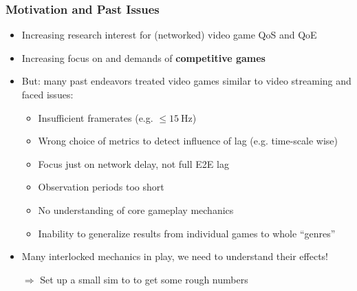 \documentclass{UDEbeamerEN}
\begin{document}
\begin{frame}
	\frametitle{Motivation and Past Issues}

	\begin{itemize}
		\item Increasing research interest for (networked) video game QoS and QoE
		\item Increasing focus on and demands of \textbf{competitive games}
		\item But: many past endeavors treated video games similar to video streaming and faced issues:
			\pause
			\begin{itemize}
				\item Insufficient framerates (e.g. $\leq \SI{15}{\hertz}$)
				\item Wrong choice of metrics to detect influence of lag (e.g. time-scale wise)
				\item Focus just on network delay, not full E2E lag
				\item Observation periods too short
				\item No understanding of core gameplay mechanics
				\item Inability to generalize results from individual games to whole ``genres''
			\end{itemize}

		\pause
		\item Many interlocked mechanics in play, we need to understand their effects!
		\item[$\Rightarrow$] Set up a small sim to to get some rough numbers
	\end{itemize}

\end{frame}
\end{document}
